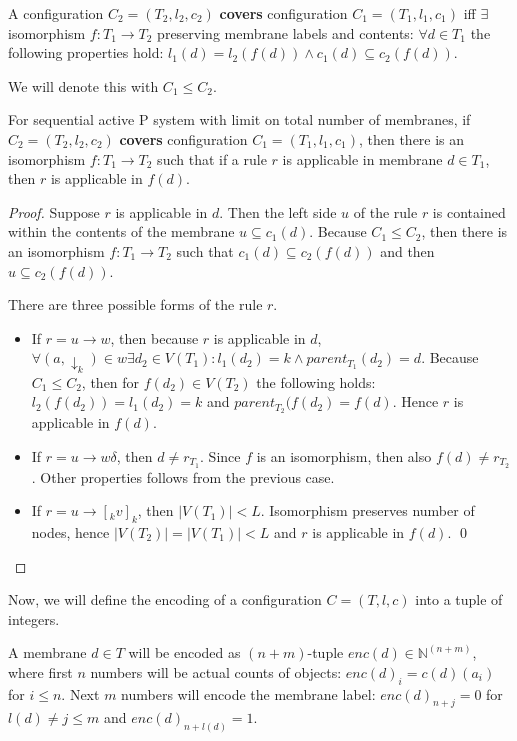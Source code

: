 \documentclass[llncs,submission,copyright,creativecommons]{../lib/lncs/llncs}
\begin{document}
A configuration $C_2 = (T_2, l_2, c_2)$ {\bf covers} configuration $C_1 = (T_1, l_1, c_1)$ iff $\exists$ isomorphism $f: T_1\rightarrow T_2$ preserving membrane labels and contents: $\forall d\in T_1$ the following properties hold: $l_1(d)=l_2(f(d))\wedge c_1(d)\subseteq c_2(f(d))$.

We will denote this with $C_1\leq C_2$.

\begin{lemma}
\label{rule_applicability_lemma}
  For sequential active P system with limit on total number of membranes, if $C_2 = (T_2, l_2, c_2)$ {\bf covers} configuration $C_1 = (T_1, l_1, c_1)$, then there is an isomorphism $f: T_1\rightarrow T_2$ such that if a rule $r$ is applicable in membrane $d\in T_1$, then $r$ is applicable in $f(d)$.
\end{lemma}

\begin{proof}
  Suppose $r$ is applicable in $d$. Then the left side $u$ of the rule $r$ is contained within the contents of the membrane $u\subseteq c_1(d)$. Because $C_1\leq C_2$, then there is an isomorphism $f:T_1\rightarrow T_2$ such that $c_1(d)\subseteq c_2(f(d))$ and then $u\subseteq c_2(f(d))$.

  There are three possible forms of the rule $r$.
  \begin{itemize}
    \item If $r = u\rightarrow w$, then because $r$ is applicable in $d$, $\forall (a,\downarrow_k)\in w \exists d_2\in V(T_1): l_1(d_2)=k \wedge parent_{T_1}(d_2) = d$. Because $C_1\leq C_2$, then for $f(d_2)\in V(T_2)$ the following holds: $l_2(f(d_2)) = l_1(d_2) = k$ and $parent_{T_2}(f(d_2) = f(d)$. Hence $r$ is applicable in $f(d)$.
    \item If $r = u\rightarrow w\delta$, then $d\neq r_{T_1}$. Since $f$ is an isomorphism, then also $f(d)\neq r_{T_2}$. Other properties follows from the previous case.
    \item If $r = u\rightarrow [_k v]_k$, then $|V(T_1)|<L$. Isomorphism preserves number of nodes, hence $|V(T_2)| = |V(T_1)| < L$ and $r$ is applicable in $f(d)$. \qed
  \end{itemize}
\end{proof}

Now, we will define the encoding of a configuration $C = (T, l, c)$ into a tuple of integers.

A membrane $d\in T$ will be encoded as $(n+m)$-tuple $enc(d)\in\mathbb N^{(n+m)}$, where first $n$ numbers will be actual counts of objects: $enc(d)_i=c(d)(a_i)$ for $i\leq n$. Next $m$ numbers will encode the membrane label: $enc(d)_{n+j} = 0$ for $l(d)\neq j\leq m$ and $enc(d)_{n+l(d)} = 1$.
\end{document}
